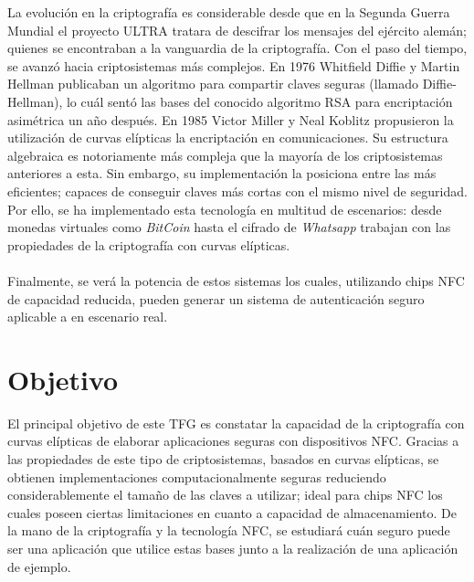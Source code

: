 \documentclass[../PFC.tex]{subfiles}
\begin{document}
La evolución en la criptografía es considerable desde que en la Segunda Guerra Mundial el proyecto ULTRA tratara de descifrar los mensajes del ejército alemán; quienes se encontraban a la vanguardia de la criptografía. Con el paso del tiempo, se avanzó hacia criptosistemas más complejos. En 1976 Whitfield Diffie y Martin Hellman publicaban un algoritmo para compartir claves seguras (llamado Diffie-Hellman)\cite{diffie1976new}, lo cuál sentó las bases del conocido algoritmo RSA \cite{rivest1978method} para encriptación asimétrica un año después. En 1985 Victor Miller y Neal Koblitz propusieron la utilización de curvas elípticas la encriptación en comunicaciones. Su estructura algebraica es notoriamente más compleja que la mayoría de los criptosistemas anteriores a esta. Sin embargo, su implementación la posiciona entre las más eficientes; capaces de conseguir claves más cortas con el mismo nivel de seguridad\cite{lucena}. Por ello, se ha implementado esta tecnología en multitud de escenarios: desde monedas virtuales como \textit{BitCoin} hasta el cifrado de \textit{Whatsapp}\cite{whatsappEncryption} trabajan con las propiedades de la criptografía con curvas elípticas.
\\\\
Finalmente, se verá la potencia de estos sistemas los cuales, utilizando chips NFC de capacidad reducida, pueden generar un sistema de autenticación seguro aplicable a en escenario real.

\section{Objetivo}
\label{Objetivo}

El principal objetivo de este TFG es constatar la capacidad de la criptografía con curvas elípticas de elaborar aplicaciones seguras con dispositivos NFC. Gracias a las propiedades de este tipo de criptosistemas, basados en curvas elípticas, se obtienen implementaciones computacionalmente seguras reduciendo considerablemente el tamaño de las claves a utilizar; ideal para chips NFC los cuales poseen ciertas limitaciones en cuanto a capacidad de almacenamiento. De la mano de la criptografía y la tecnología NFC, se estudiará cuán seguro puede ser una aplicación que utilice estas bases junto a la realización de una aplicación de ejemplo.
\end{document}
